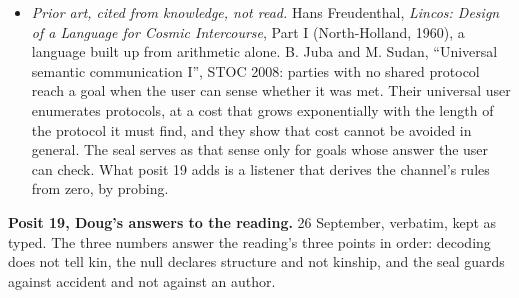 \begin{itemize}
\item \emph{Prior art, cited from knowledge, not read.} Hans Freudenthal, \emph{Lincos: Design of a Language for Cosmic Intercourse}, Part I (North-Holland, 1960), a language built up from arithmetic alone. B. Juba and M. Sudan, “Universal semantic communication I”, STOC 2008: parties with no shared protocol reach a goal when the user can sense whether it was met. Their universal user enumerates protocols, at a cost that grows exponentially with the length of the protocol it must find, and they show that cost cannot be avoided in general. The seal serves as that sense only for goals whose answer the user can check. What posit 19 adds is a listener that derives the channel's rules from zero, by probing.
\end{itemize}

\textbf{Posit 19, Doug's answers to the reading.} 26 September, verbatim, kept as typed. The three numbers answer the reading's three points in order: decoding does not tell kin, the null declares structure and not kinship, and the seal guards against accident and not against an author.

